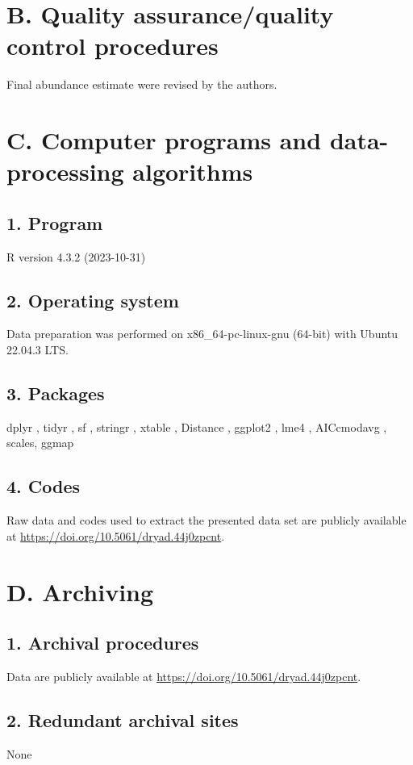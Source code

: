 \documentclass[a4paper,twoside,12pt]{article}
\begin{document}
    \section*{B. Quality assurance/quality control procedures}
    Final abundance estimate were revised by the authors.

    \section*{C. Computer programs and data-processing algorithms}
         \subsection*{1. Program} R version 4.3.2 (2023-10-31)
         \subsection*{2. Operating system} Data preparation was performed on x86\_64-pc-linux-gnu (64-bit) with Ubuntu 22.04.3 LTS.
         \subsection*{3. Packages} dplyr \citep{dplyr}, tidyr \citep{tidyr}, sf \citep{sf}, stringr \citep{stringr}, xtable \citep{xtable}, Distance \citep{miller2019}, ggplot2 \citep{ggplot2}, lme4 \citep{lme4}, AICcmodavg \citep{AICcmodavg}, scales\citep{scales}, ggmap \citep{ggmap}
         \subsection*{4. Codes} Raw data and codes used to extract the presented data set are publicly available at \url{https://doi.org/10.5061/dryad.44j0zpcnt}.
                
    \section*{D. Archiving}
         \subsection*{1. Archival procedures} Data are publicly available at \url{https://doi.org/10.5061/dryad.44j0zpcnt}.
         \subsection*{2. Redundant archival sites} None
            
\end{document}
